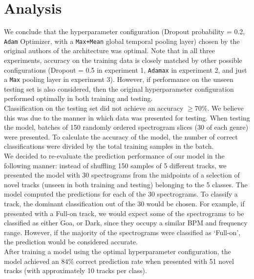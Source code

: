 \documentclass[12pt]{article}
\newcounter{ct}
\begin{document}
\section*{Analysis}

We conclude that the hyperparameter configuration 
(Dropout probability = 0.2, {\tt Adam} Optimizer, with a 
{\tt Max+Mean} global temporal pooling layer)
chosen by the original authors of the architecture was optimal.
Note that in all three experiments, accuracy on the training
data is closely matched by other possible configurations (Dropout = 0.5
in experiment 1, {\tt Adamax} in experiment 2, and just 
a {\tt Max} pooling layer in experiment 3). However, if performance
on the unseen testing set is also considered, 
then the original hyperparameter
configuration performed optimally
in both training and testing.\\
Classification on the testing set did not achieve an
accuracy $\ge 70\%$. We believe this was due to the manner
in which data was presented for testing. When testing the model, 
batches of 150 randomly ordered spectrogram slices 
(30 of each genre) were presented.
To calculate the accuracy of the model, the number of correct 
classifications were divided by the total training samples in the batch.\\
We decided to re-evaluate the prediction performance of our model 
in the following manner: instead of shuffling
150 samples of 5 different tracks, we presented the model 
with 30 spectrograms from the midpoints of a selection of novel tracks
(unseen in both training and testing)
belonging to the 5 classes. The model computed the predictions
for each of the 30 spectrograms. To classify a track, the 
dominant classification out of the 30 would be chosen. For example, 
if presented with a Full-on track, we would expect some of the 
spectrograms to be classified as either Goa, or Dark, since they 
occupy a similar BPM and frequency range. However, if the majority
of the spectrograms were classified as `Full-on', 
the prediction would be considered accurate.\\
After training a model using the optimal hyperparameter configuration,
the model achieved 
an $84\%$ correct prediction rate when presented with
51 novel tracks (with approximately 10 tracks per class).
\end{document}
